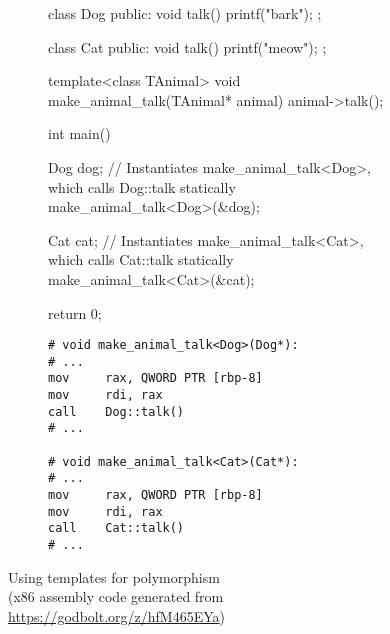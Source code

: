 \begin{figure}[ht]
    \centering
    \begin{subfigure}{0.49\linewidth}%
        \begin{cppcode}
class Dog {
public:
    void talk() {
        printf("bark\n");
    }
};

class Cat {
public:
    void talk() {
        printf("meow\n");
    }
};

template<class TAnimal>
void make_animal_talk(TAnimal* animal) {
    animal->talk();
}

int main() {
    Dog dog{};
    // Instantiates make_animal_talk<Dog>, which calls Dog::talk statically
    make_animal_talk<Dog>(&dog);

    Cat cat{};
    // Instantiates make_animal_talk<Cat>, which calls Cat::talk statically
    make_animal_talk<Cat>(&cat);

    return 0;
}
        \end{cppcode}
    \end{subfigure}
    \begin{subfigure}{0.49\linewidth}%
        \begin{verbatim}
# void make_animal_talk<Dog>(Dog*):
# ...
mov     rax, QWORD PTR [rbp-8]
mov     rdi, rax
call    Dog::talk()
# ...
        
# void make_animal_talk<Cat>(Cat*):
# ...
mov     rax, QWORD PTR [rbp-8]
mov     rdi, rax
call    Cat::talk()
# ...
        \end{verbatim}
    \end{subfigure}%
    \caption{Using templates for polymorphism\\(x86 assembly code generated from \url{https://godbolt.org/z/hfM465EYa})}%
    \label{fig:templated_polymorphism}%
\end{figure}
